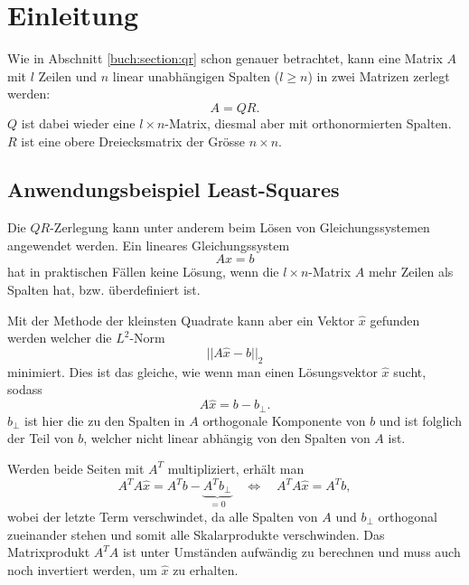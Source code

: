 %
%
%
\section{Einleitung\label{qr:section:einleitung}}
Wie in Abschnitt \ref{buch:section:qr} schon genauer betrachtet, kann eine Matrix $A$ mit $l$ Zeilen und $n$ linear unabhängigen Spalten ($l\ge n$) in zwei Matrizen zerlegt werden:
\begin{equation*}
A=QR.
\end{equation*}
$Q$ ist dabei wieder eine $l\times n$-Matrix, diesmal aber mit orthonormierten Spalten.
$R$ ist eine obere Dreiecksmatrix der Grösse $n\times n$.

\subsection{Anwendungsbeispiel Least-Squares\label{qr:section:ls}}
Die $QR$-Zerlegung kann unter anderem beim Lösen von Gleichungssystemen angewendet werden.
Ein lineares Gleichungssystem
\begin{equation}
Ax=b\label{qr:sle}
\end{equation}
hat in praktischen Fällen keine Lösung, wenn die $l\times n$-Matrix $A$ mehr Zeilen als Spalten hat, bzw. überdefiniert ist.

Mit der Methode der kleinsten Quadrate kann aber ein Vektor $\hat{x}$ gefunden werden welcher die $L^2$-Norm
\begin{equation*}
||A\hat{x}-b||_2
\end{equation*}
minimiert.
Dies ist das gleiche, wie wenn man einen Lösungsvektor $\hat{x}$ sucht, sodass
\begin{equation*}
A\hat{x}=b-b_{\perp}.
\end{equation*}
$b_{\perp}$ ist hier die zu den Spalten in $A$ orthogonale Komponente von $b$ und ist folglich der Teil von $b$, welcher nicht linear abhängig von den Spalten von $A$ ist.

Werden beide Seiten mit $A^T$ multipliziert, erhält man
\begin{equation}
A^TA\hat{x}=A^Tb-\underbrace{A^Tb_{\perp}}_{\displaystyle=0}
\quad\Leftrightarrow\quad A^TA\hat{x}=A^Tb \label{qr:ls1},
\end{equation}
wobei der letzte Term verschwindet, da alle Spalten von $A$ und $b_{\perp}$ orthogonal zueinander stehen und somit alle Skalarprodukte verschwinden.
Das Matrixprodukt $A^TA$ ist unter Umständen aufwändig zu berechnen und muss auch noch invertiert werden, um $\hat{x}$ zu erhalten.

